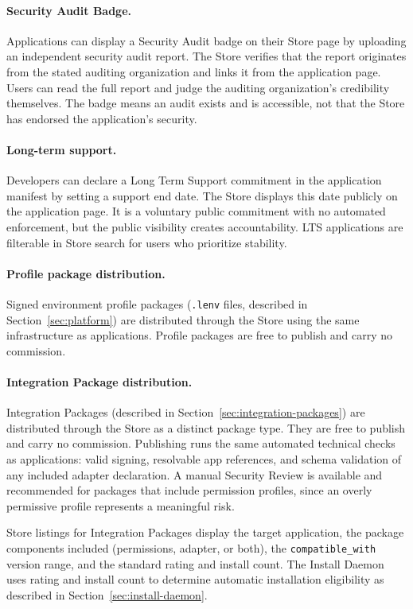 \paragraph{Security Audit Badge.}
Applications can display a Security Audit badge on their Store page by
uploading an independent security audit report. The Store verifies that the
report originates from the stated auditing organization and links it from the
application page. Users can read the full report and judge the auditing
organization's credibility themselves. The badge means an audit exists and is
accessible, not that the Store has endorsed the application's security.

\paragraph{Long-term support.}
Developers can declare a Long Term Support commitment in the application
manifest by setting a support end date. The Store displays this date publicly
on the application page. It is a voluntary public commitment with no automated
enforcement, but the public visibility creates accountability. LTS applications
are filterable in Store search for users who prioritize stability.

\paragraph{Profile package distribution.}
Signed environment profile packages (\texttt{.lenv} files, described in
Section~\ref{sec:platform}) are distributed through the Store using the same
infrastructure as applications. Profile packages are free to publish and carry
no commission.

\paragraph{Integration Package distribution.}
Integration Packages (described in Section~\ref{sec:integration-packages}) are
distributed through the Store as a distinct package type. They are free to
publish and carry no commission. Publishing runs the same automated technical
checks as applications: valid signing, resolvable app references, and schema
validation of any included adapter declaration. A manual Security Review is
available and recommended for packages that include permission profiles, since
an overly permissive profile represents a meaningful risk.

Store listings for Integration Packages display the target application, the
package components included (permissions, adapter, or both), the
\texttt{compatible\_with} version range, and the standard rating and install
count. The Install Daemon uses rating and install count to determine automatic
installation eligibility as described in Section~\ref{sec:install-daemon}.

